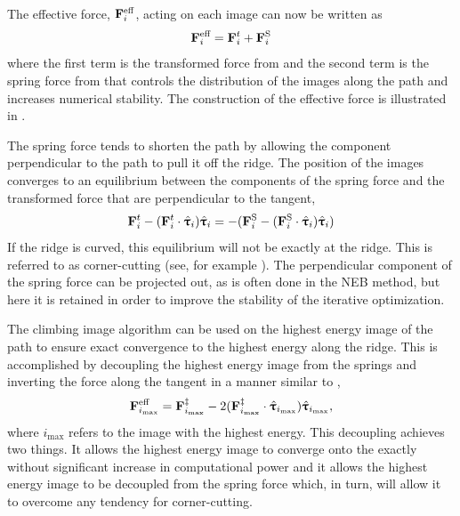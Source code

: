 The effective force, ${\mathrm{\mathbf{\bm{F}}}}_i^\text{eff}$, acting on each image can now be written as
\begin{equation}
{\ensuremath{\mathrm{\mathbf{\bm{F}}}}}_i^\text{eff} = {\mathrm{\mathbf{\bm{F}}}}_i^t + {\mathrm{\mathbf{\bm{F}}}}_i^\text{S}
\label{eq:effective-force}
\end{equation}
where the first term is the transformed force from  and the second term is the spring force from  that controls the distribution of the images along the path and increases numerical stability.
The construction of the effective force is illustrated in .

The spring force tends to shorten the path by allowing the component perpendicular to the path to pull it off the ridge.
The position of the images converges to an equilibrium between the components of the spring force and the transformed force that are perpendicular to the tangent,
\begin{equation}
{\ensuremath{\mathrm{\mathbf{\bm{F}}}}}^t_i - ({\mathrm{\mathbf{\bm{F}}}}^t_i \cdot \hat{{\mathrm{\mathbf{\bm{\uptau}}}}}_i)\hat{{\mathrm{\mathbf{\bm{\uptau}}}}}_i = - ({\mathrm{\mathbf{\bm{F}}}}^\text{S}_i - ({\mathrm{\mathbf{\bm{F}}}}^\text{S}_i \cdot \hat{{\mathrm{\mathbf{\bm{\uptau}}}}}_i)\hat{{\mathrm{\mathbf{\bm{\uptau}}}}}_i)
\end{equation}
If the ridge is curved, this equilibrium will not be exactly at the ridge.
This is referred to as corner-cutting (see, for example \cite{neb-original-1998}).
The perpendicular component of the spring force can be projected out, as is often done in the NEB method, but here it is retained in order to improve the stability of the iterative optimization.

The climbing image algorithm \cite{neb-ci-2000} can be used on the highest energy image of the path to ensure exact convergence to the highest energy  along the ridge.
This is accomplished by decoupling the highest energy image from the springs and inverting the force along the tangent in a manner similar to ,
\begin{equation}
{\ensuremath{\mathrm{\mathbf{\bm{F}}}}}_{i_\text{max}}^\text{eff} = {\mathrm{\mathbf{\bm{F}}}}_{i_\text{max}}^\ddagger - 2 ({\mathrm{\mathbf{\bm{F}}}}_{i_\text{max}}^\ddagger \cdot \hat{{\mathrm{\mathbf{\bm{\uptau}}}}}_{i_\text{max}})\hat{{\mathrm{\mathbf{\bm{\uptau}}}}}_{i_\text{max}},
\label{eq:neb-ci}
\end{equation}
where $i_\text{max}$ refers to the image with the highest energy.
This decoupling achieves two things.
It allows the highest energy image to converge onto the  exactly without significant increase in computational power and it allows the highest energy image to be decoupled from the spring force which, in turn, will allow it to overcome any tendency for corner-cutting.

